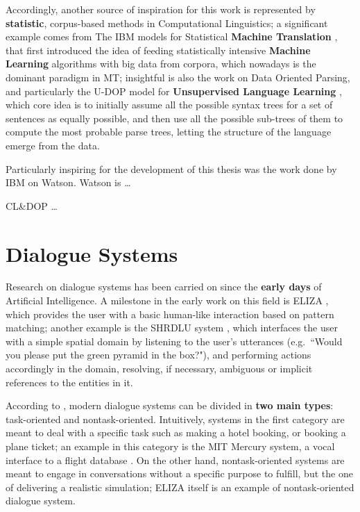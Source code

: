 Accordingly, another source of inspiration for this work is represented by \textbf{statistic}, corpus-based methods in Computational Linguistics; a significant example comes from The IBM models for Statistical \textbf{Machine Translation} \citep{Brown:1993:MSM:972470.972474}, that first introduced the idea of feeding statistically intensive \textbf{Machine Learning} algorithms with big data from corpora, which nowadays is the dominant paradigm in MT; insightful is also the work on Data Oriented Parsing, and particularly the U-DOP model for \textbf{Unsupervised Language Learning} \citep{Bod:2006:UPU:1596276.1596293}, which core idea is to initially assume all the possible syntax trees for a set of sentences as equally possible, and then use all the possible sub-trees of them to compute the most probable parse trees, letting the structure of the language emerge from the data.

Particularly inspiring for the development of this thesis was the work done by IBM on Watson. Watson is \ldots 

CL\&DOP \ldots



\section{Dialogue Systems}

Research on dialogue systems has been carried on since the \textbf{early days} of Artificial Intelligence. A milestone in the early work on this field is ELIZA \citep{Weizenbaum:1966:ECP:365153.365168}, which provides the user with a basic human-like interaction based on pattern matching; another example is the SHRDLU system \citep{winograd1971procedure}, which interfaces the user with a simple spatial domain by listening to the user's utterances (e.g.\ ``Would you please put the green pyramid in the box?"), and performing actions accordingly in the domain, resolving, if necessary, ambiguous or implicit references to the entities in it.

According to \cite{Jokinen2009}, modern dialogue systems can be divided in \textbf{two main types}: task-oriented and nontask-oriented. Intuitively, systems in the first category are meant to deal with a specific task such as making a hotel booking, or booking a plane ticket; an example in this category is the MIT Mercury system, a vocal interface to a flight database \citep{Seneff:2000:DMM:1605285.1605288}. On the other hand, nontask-oriented systems are meant to engage in conversations without a specific purpose to fulfill, but the one of delivering a realistic simulation; ELIZA itself is an example of nontask-oriented dialogue system.


